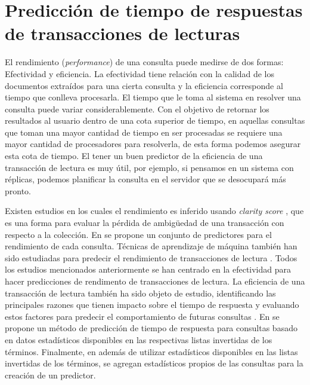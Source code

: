 \section{Predicción de tiempo de respuestas de transacciones de lecturas}
\label{marco:prediccion}
El rendimiento (\textit{performance}) de una consulta puede medirse de dos formas: Efectividad y eficiencia. La efectividad tiene relación con la calidad de los documentos extraídos para una cierta consulta y la eficiencia corresponde al tiempo que conlleva procesarla. El tiempo que le toma al sistema en resolver una consulta puede variar considerablemente. Con el objetivo de retornar los resultados al usuario dentro de una cota superior de tiempo, en aquellas consultas que toman una mayor cantidad de tiempo en ser procesadas se requiere una mayor cantidad de procesadores para resolverla, de esta forma podemos asegurar esta cota de tiempo. El tener un buen predictor de la eficiencia de una transacción de lectura es muy útil, por ejemplo, si pensamos en un sistema con réplicas, podemos planificar la consulta en el servidor que se desocupará más pronto. 

Existen estudios en los cuales el rendimiento es inferido usando \textit{clarity score} \citep{Cronen-Townsend:2002}, que es una forma para evaluar la pérdida de ambigüedad de una transacción con respecto a la colección. En \citep{He:2004} se propone un conjunto de predictores para el rendimiento de cada consulta. Técnicas de aprendizaje de máquina también han sido estudiadas para predecir el rendimiento de transacciones de lectura \citep{Si:2002}. Todos los estudios mencionados anteriormente se han centrado en la efectividad para hacer predicciones de rendimento de transacciones de lectura. La eficiencia de una transacción de lectura también ha sido objeto de estudio, identificando las principales razones que tienen impacto sobre el tiempo de respuesta y evaluando estos factores para predecir el comportamiento de futuras consultas \citep{Tonellotto:2011}. En \citep{Macdonald:2012} se propone un método de predicción de tiempo de respuesta para consultas basado en datos estadísticos disponibles en las respectivas listas invertidas de los términos. Finalmente, en \citep{Jeon:2014} además de utilizar estadísticos disponibles en las listas invertidas de los términos, se agregan estadísticos propios de las consultas para la creación de un predictor. 

